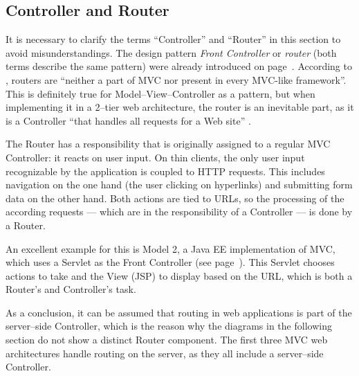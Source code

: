 \subsection*{Controller and Router}
\label{term:router}
It is necessary to clarify the terms ``Controller'' and ``Router'' in this section to avoid misunderstandings. The design pattern \emph{Front Controller} or \emph{\gls{router}} (both terms describe the same pattern) were already introduced on page~\pageref{term:frontcontroller}. According to , routers are ``neither a part of MVC nor present in every MVC-like framework''. This is definitely true for Model--View--Controller as a pattern, but when implementing it in a 2--tier web architecture, the router is an inevitable part, as it is a Controller ``that handles all requests for a Web site'' \cite[p. 344]{poeaa}.

The Router has a responsibility that is originally assigned to a regular MVC Controller: it reacts on user input. On thin clients, the only user input recognizable by the application is coupled to HTTP requests. This includes navigation on the one hand (the user clicking on hyperlinks) and submitting form data on the other hand. Both actions are tied to URLs, so the processing of the according requests --- which are in the responsibility of a Controller --- is done by a Router.

An excellent example for this is Model 2, a Java EE implementation of MVC, which uses a Servlet as the Front Controller (see page~\pageref{term:model2}). This Servlet chooses actions to take and the View (JSP) to display based on the URL, which is both a Router's and Controller's task.

As a conclusion, it can be assumed that routing in web applications is part of the server--side Controller, which is the reason why the diagrams in the following section do not show a distinct Router component. The first three MVC web architectures handle routing on the server, as they all include a server--side Controller. %

